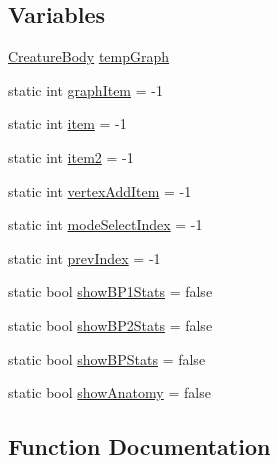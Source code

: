 \subsection*{Variables}
\begin{DoxyCompactItemize}
\item 
\mbox{\hyperlink{class_creature_body}{Creature\+Body}} \mbox{\hyperlink{namespace_body_graph_viewer_a01a522e1563b41777d37865fd90ff099}{temp\+Graph}}
\item 
static int \mbox{\hyperlink{namespace_body_graph_viewer_a3ec477169bc8a7b40f921786efd06606}{graph\+Item}} = -\/1
\item 
static int \mbox{\hyperlink{namespace_body_graph_viewer_ac66460996e5ba44173805ee20a4afbfe}{item}} = -\/1
\item 
static int \mbox{\hyperlink{namespace_body_graph_viewer_abfa96d631585800b2ad3bfcc8b168759}{item2}} = -\/1
\item 
static int \mbox{\hyperlink{namespace_body_graph_viewer_a1d89b36538f61208083f64c09567bab0}{vertex\+Add\+Item}} = -\/1
\item 
static int \mbox{\hyperlink{namespace_body_graph_viewer_abc623d45ce49c25addd035c15cf011f1}{mode\+Select\+Index}} = -\/1
\item 
static int \mbox{\hyperlink{namespace_body_graph_viewer_a5a6ce83ee5afc3f1a6f95c3ad9535244}{prev\+Index}} = -\/1
\item 
static bool \mbox{\hyperlink{namespace_body_graph_viewer_aae717b76a1ea13a8a6f3237a2d5ce700}{show\+B\+P1\+Stats}} = false
\item 
static bool \mbox{\hyperlink{namespace_body_graph_viewer_a7930b4ead9318082fc4c495e75ca4b02}{show\+B\+P2\+Stats}} = false
\item 
static bool \mbox{\hyperlink{namespace_body_graph_viewer_a8cb54e80ade981414d85ecedc10f41a4}{show\+B\+P\+Stats}} = false
\item 
static bool \mbox{\hyperlink{namespace_body_graph_viewer_a9729b5be0302ac6ae1d581ef7b909b8e}{show\+Anatomy}} = false
\end{DoxyCompactItemize}


\subsection{Function Documentation}
\mbox{\label{namespace_body_graph_viewer_a269151dfadc20a939854d1187a7ef914}} 
